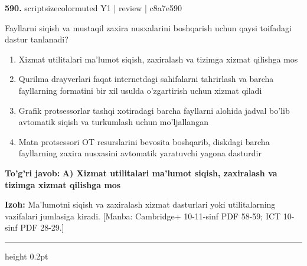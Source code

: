 \documentclass[10pt,a4paper]{article}
\begin{document}
{\bfseries\sffamily\color{ink} 590.} {scriptsizecolor{muted} Y1 | review | c8a7e590}
\par
Fayllarni siqish va mustaqil zaxira nusxalarini boshqarish uchun qaysi toifadagi dastur tanlanadi?
\begin{enumerate}[label=\Alph*),leftmargin=9mm]
\item Xizmat utilitalari ma'lumot siqish, zaxiralash va tizimga xizmat qilishga mos
\item Qurilma drayverlari faqat internetdagi sahifalarni tahrirlash va barcha fayllarning formatini bir xil usulda o'zgartirish uchun xizmat qiladi
\item Grafik protsessorlar tashqi xotiradagi barcha fayllarni alohida jadval bo'lib avtomatik siqish va turkumlash uchun mo'ljallangan
\item Matn protsessori OT resurslarini bevosita boshqarib, diskdagi barcha fayllarning zaxira nusxasini avtomatik yaratuvchi yagona dasturdir
\end{enumerate}
\begin{tcolorbox}[enhanced,breakable,colback=teal!4,colframe=teal!60!black,boxrule=0.45pt,arc=1.2mm,left=2.7mm,right=2.7mm,top=1.8mm,bottom=1.8mm,before skip=2mm,after skip=2mm]
{\bfseries\sffamily\color{teal}To'g'ri javob:} \textbf{A) Xizmat utilitalari ma'lumot siqish, zaxiralash va tizimga xizmat qilishga mos}
\par\smallskip
{\bfseries Izoh:} Ma'lumotni siqish va zaxiralash xizmat dasturlari yoki utilitalarning vazifalari jumlasiga kiradi. [Manba: Cambridge+ 10-11-sinf PDF 58-59; ICT 10-sinf PDF 28-29.]
\end{tcolorbox}
\vspace{2mm}\hrule height 0.2pt\vspace{3mm}
\end{document}
